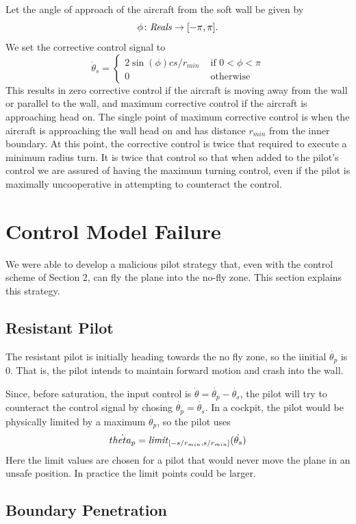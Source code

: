 \documentclass[11pt]{article}
\begin{document}
Let the angle of approach of the aircraft from the soft wall be given by
\[
\phi \colon \mbox{\textit{Reals}} \to [-\pi, \pi].
\]
We set the corrective control signal to
\[
\dot{\theta}_s = \left \{
\begin{array}{ll}
2 \sin(\phi) c s/r_{min}& \mbox{ if } 0 < \phi < \pi\\
0 & \mbox{ otherwise}
\end{array}
\right .
\]
This results in zero corrective control if the aircraft is moving
away from the wall or parallel to the wall, and maximum corrective
control if the aircraft is approaching head on.  The single point
of maximum corrective control is when the aircraft is approaching
the wall head on and has distance $r_{min}$ from the inner boundary.
At this point, the corrective control is twice that required to
execute a minimum radius turn.  It is twice that control so that
when added to the pilot's control we are assured of having
the maximum turning control, even if the pilot is maximally
uncooperative in attempting to counteract the control.

\section{Control Model Failure}

We were able to develop a malicious pilot strategy that, even with the control scheme of Section 2, can fly the plane into the no-fly zone.  This section explains this strategy.

\subsection{Resistant Pilot}

The resistant pilot is initially heading towards the no fly zone, so the iinitial $\dot{\theta_{p}}$ is $0$.  That is, the pilot intends to maintain forward motion and crash into the wall.  

Since, before saturation, the input control is $\dot{\theta} = \dot{\theta_{p}} - \dot{\theta_{s}}$, the pilot will try to counteract the control signal by chosing $\dot{\theta_{p}} = \dot{\theta_{s}}$.  In a cockpit, the pilot would be physically limited by a maximum $\dot{\theta_{p}}$,  so the pilot uses
\[
\dot{theta_{p}} = \mbox{\textit{limit}}_{[-s/r_{min},s/r_{min}]}(\dot{\theta_{s}})
\]
Here the limit values are chosen for a pilot that would never move the plane in an unsafe position.  In practice the limit points could be larger.

\subsection{Boundary Penetration}
\end{document}

